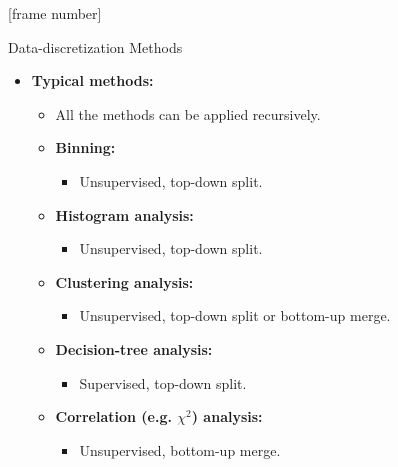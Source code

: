 \documentclass[aspectratio=169,t]{beamer}
\begin{document}
  {
    [frame number]
    \begin{frame}{Data-discretization Methods}
    \begin{itemize}
      \item \textbf{Typical methods:}
      \begin{itemize}
        \item All the methods can be applied recursively.
        \item \textbf{Binning:}
              \begin{itemize}
                \item Unsupervised, top-down split.
              \end{itemize}
        \item \textbf{Histogram analysis:}
              \begin{itemize}
                \item Unsupervised, top-down split.
              \end{itemize}
        \item \textbf{Clustering analysis:}
              \begin{itemize}
                \item Unsupervised, top-down split or bottom-up merge.
              \end{itemize}
        \item \textbf{Decision-tree analysis:}
              \begin{itemize}
                \item Supervised, top-down split.
              \end{itemize}
        \item \textbf{Correlation (e.g. $\chi^2$) analysis:}
              \begin{itemize}
                \item Unsupervised, bottom-up merge.
              \end{itemize}
      \end{itemize}
    \end{itemize}
    \end{frame}
  }
\end{document}
